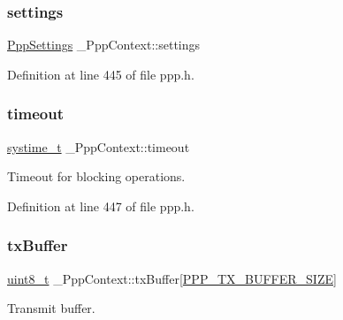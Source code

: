 \mbox{\label{struct__PppContext_ad9bfb6703f692d2a5b09344a98e58dbf}} 
\subsubsection{\texorpdfstring{settings}{settings}}
{\footnotesize\ttfamily \hyperlink{structPppSettings}{Ppp\+Settings} \+\_\+\+Ppp\+Context\+::settings}



Definition at line 445 of file ppp.\+h.

\mbox{\label{struct__PppContext_a3688a9a51ed43e378cde49360bd9f45a}} 
\subsubsection{\texorpdfstring{timeout}{timeout}}
{\footnotesize\ttfamily \hyperlink{compiler__port_8h_ae3e32a98d431a02106616da3071832dd}{systime\+\_\+t} \+\_\+\+Ppp\+Context\+::timeout}



Timeout for blocking operations. 



Definition at line 447 of file ppp.\+h.

\mbox{\label{struct__PppContext_a4e0e252ab245c4a21c9664bc4bb84975}} 
\subsubsection{\texorpdfstring{tx\+Buffer}{txBuffer}}
{\footnotesize\ttfamily \hyperlink{stdint_8h_aba7bc1797add20fe3efdf37ced1182c5}{uint8\+\_\+t} \+\_\+\+Ppp\+Context\+::tx\+Buffer\mbox{[}\hyperlink{ppp_8h_aeceded3683e4b7adb67239e8e2225e71}{P\+P\+P\+\_\+\+T\+X\+\_\+\+B\+U\+F\+F\+E\+R\+\_\+\+S\+I\+ZE}\mbox{]}}



Transmit buffer. 



